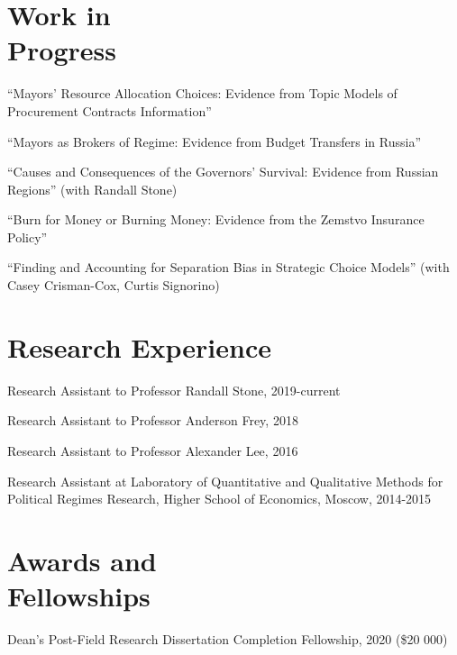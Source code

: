 \documentclass[margin,line,12pt]{res}
\begin{document}
\begin{resume}
\section{\sc Work in \\ Progress}
``Mayors’ Resource Allocation Choices: Evidence from Topic Models of Procurement
Contracts Information''


\vspace*{-3.5mm}


``Mayors as Brokers of Regime: Evidence from Budget Transfers in Russia''


\vspace*{-3.5mm}

``Causes and Consequences of the Governors' Survival: Evidence from Russian Regions'' (with Randall Stone)

\vspace*{-3.5mm}
``Burn for Money or Burning Money: Evidence from the Zemstvo Insurance Policy''


\vspace*{-3.5mm}
``Finding and Accounting for Separation Bias in Strategic Choice Models'' (with Casey Crisman-Cox, Curtis Signorino)




\section{\sc Research Experience}

Research Assistant to Professor Randall Stone, 2019-current 

\vspace*{-4.5mm}
Research Assistant to Professor Anderson Frey, 2018

\vspace*{-4.5mm}
Research Assistant to Professor Alexander Lee, 2016

\vspace*{-4.5mm}
Research Assistant at Laboratory of Quantitative and Qualitative Methods 
for Political Regimes Research, Higher School of Economics, Moscow, 2014-2015 

\section{\sc Awards and \\ Fellowships}
Dean's Post-Field Research Dissertation Completion Fellowship, 2020 (\$20 000)
\vspace*{-4.5mm}


\end{resume}
\end{document}
